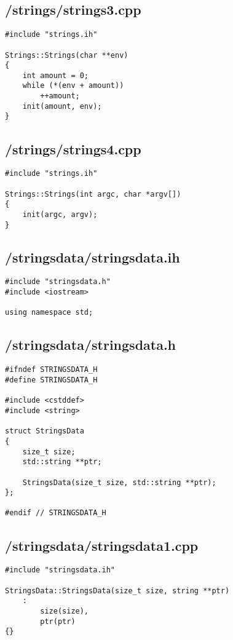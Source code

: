 \documentclass{article}
\begin{document}
\subsection*{/strings/strings3.cpp}
\begin{verbatim}
#include "strings.ih"

Strings::Strings(char **env)
{
    int amount = 0;
    while (*(env + amount))
        ++amount;
    init(amount, env);
}
\end{verbatim}
\subsection*{/strings/strings4.cpp}
\begin{verbatim}
#include "strings.ih"

Strings::Strings(int argc, char *argv[])
{
    init(argc, argv);
}
\end{verbatim}

\subsection*{/stringsdata/stringsdata.ih}
\begin{verbatim}
#include "stringsdata.h"
#include <iostream>

using namespace std;

\end{verbatim}
\subsection*{/stringsdata/stringsdata.h}
\begin{verbatim}
#ifndef STRINGSDATA_H
#define STRINGSDATA_H

#include <cstddef>
#include <string>

struct StringsData 
{
    size_t size;
    std::string **ptr;

    StringsData(size_t size, std::string **ptr);
};

#endif // STRINGSDATA_H

\end{verbatim}
\subsection*{/stringsdata/stringsdata1.cpp}
\begin{verbatim}
#include "stringsdata.ih"

StringsData::StringsData(size_t size, string **ptr)
    :
        size(size),
        ptr(ptr)
{}

\end{verbatim}
\end{document}

